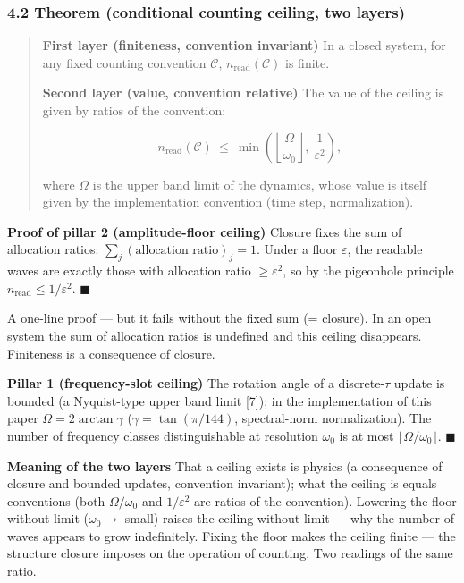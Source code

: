 \documentclass[
  a4paper,
]{article}
\begin{document}
\subsubsection{4.2 Theorem (conditional counting ceiling, two
layers)}\label{theorem-conditional-counting-ceiling-two-layers}

\begin{quote}
\textbf{First layer (finiteness, convention invariant)} In a closed
system, for any fixed counting convention \(\mathcal C\),
\(n_{\mathrm{read}}(\mathcal C)\) is finite.

\textbf{Second layer (value, convention relative)} The value of the
ceiling is given by ratios of the convention:

\[
n_{\mathrm{read}}(\mathcal C)\ \le\ \min\left(\left\lfloor\frac{\Omega}{\omega_0}\right\rfloor,\ \frac{1}{\varepsilon^2}\right),
\]

where \(\Omega\) is the upper band limit of the dynamics, whose value is
itself given by the implementation convention (time step,
normalization).
\end{quote}

\textbf{Proof of pillar 2 (amplitude-floor ceiling)} Closure fixes the
sum of allocation ratios: \(\sum_j(\text{allocation ratio})_j=1\). Under
a floor \(\varepsilon\), the readable waves are exactly those with
allocation ratio \(\ge\varepsilon^2\), so by the pigeonhole principle
\(n_{\mathrm{read}}\le1/\varepsilon^2\). \(\blacksquare\)

A one-line proof --- but it fails without the fixed sum (= closure). In
an open system the sum of allocation ratios is undefined and this
ceiling disappears. Finiteness is a consequence of closure.

\textbf{Pillar 1 (frequency-slot ceiling)} The rotation angle of a
discrete-\(\tau\) update is bounded (a Nyquist-type upper band limit
{[}7{]}); in the implementation of this paper \(\Omega=2\arctan\gamma\)
(\(\gamma=\tan(\pi/144)\), spectral-norm normalization). The number of
frequency classes distinguishable at resolution \(\omega_0\) is at most
\(\lfloor\Omega/\omega_0\rfloor\). \(\blacksquare\)

\textbf{Meaning of the two layers} That a ceiling exists is physics (a
consequence of closure and bounded updates, convention invariant); what
the ceiling is equals conventions (both \(\Omega/\omega_0\) and
\(1/\varepsilon^2\) are ratios of the convention). Lowering the floor
without limit (\(\omega_0\to\) small) raises the ceiling without limit
--- why the number of waves appears to grow indefinitely. Fixing the
floor makes the ceiling finite --- the structure closure imposes on the
operation of counting. Two readings of the same ratio.
\end{document}
